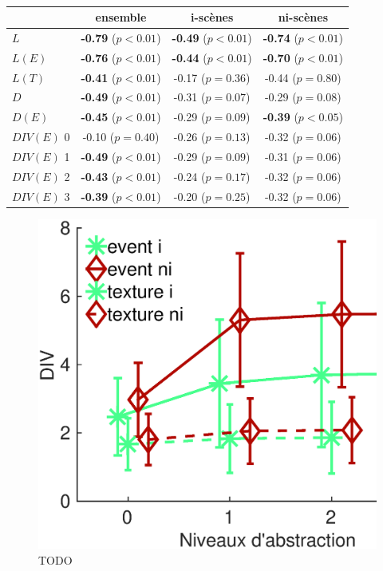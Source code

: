 \begin{table}[t]
\centering
\begin{tabular}{l c c c} 
               & ensemble                     & i-scènes                   & ni-scènes    \\
\hline
$L$            & \textbf{-0.79} ($p<0.01$)    & \textbf{-0.49} ($p<0.01$)  & \textbf{-0.74} ($p<0.01$)\\
$L(E)$         & \textbf{-0.76} ($p<0.01$)    & \textbf{-0.44} ($p<0.01$)  & \textbf{-0.70} ($p<0.01$)\\
$L(T)$         & \textbf{-0.41} ($p<0.01$)    & -0.17 ($p=0.36$)           & -0.44 ($p=0.80$) \\
$D$            & \textbf{-0.49} ($p<0.01$)    & -0.31 ($p=0.07$)           & -0.29 ($p=0.08$)\\
$D(E)$         & \textbf{-0.45} ($p<0.01$)    & -0.29 ($p=0.09$)           & \textbf{-0.39} ($p<0.05$)\\
$DIV(E)$ 0     &         -0.10  ($p=0.40$)    & -0.26 ($p=0.13$)           & -0.32 ($p=0.06$)\\
$DIV(E)$ 1     & \textbf{-0.49} ($p<0.01$)    & -0.29 ($p=0.09$)           & -0.31 ($p=0.06$)\\
$DIV(E)$ 2     & \textbf{-0.43} ($p<0.01$)    & -0.24 ($p=0.17$)           & -0.32 ($p=0.06$)\\
$DIV(E)$ 3     & \textbf{-0.39} ($p<0.01$)    & -0.20 ($p=0.25$)           & -0.32 ($p=0.06$)\\
\hline
\end{tabular}
\vspace{0.5mm}
\caption{}
\label{tab:corrSmXP4}
\end{table}

\begin{figure}[t]
        \myfloatalign
        \includegraphics[width=.8\linewidth]{gfxXpUrbanSoundscape/xp4_div_1}
        \caption[TODO]{TODO}\label{fig:diversitySansMarker}
\end{figure}

